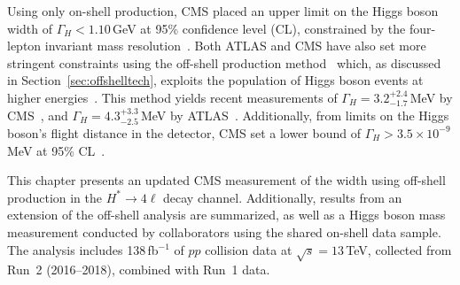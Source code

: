 Using only on-shell production, CMS placed an upper limit on the Higgs boson width of $\Gamma_H < 1.10$\,GeV at 95\% confidence level (CL), constrained by the four-lepton invariant mass resolution~\cite{Khachatryan:2014jba, Sirunyan:2017exp}. Both ATLAS and CMS have also set more stringent constraints using the off-shell production method~\cite{Khachatryan:2014iha, Aad:2015xua, Khachatryan:2015mma, Khachatryan:2016ctc, Aaboud:2018puo, Sirunyan:2019twz, CMS:2022ley} which, as discussed in Section~\ref{sec:offshelltech}, exploits the population of Higgs boson events at higher energies~\cite{Caola:2013yja, Kauer:2012hd, Campbell:2013una}. This method yields recent measurements of $\Gamma_H = 3.2^{+2.4}_{-1.7}$\,MeV by CMS~\cite{CMS:2022ley}, and $\Gamma_H = 4.3^{+3.3}_{-2.5}$\,MeV by ATLAS~\cite{atlascollaboration2023evidence}. Additionally, from limits on the Higgs boson's flight distance in the detector, CMS set a lower bound of $\Gamma_H > 3.5 \times 10^{-9}$\,MeV at 95\% CL~\cite{Khachatryan:2015mma}.

This chapter presents an updated CMS measurement of the \Hboson width using off-shell production in the $H^* \to 4\ell$ decay channel. Additionally, results from an extension of the off-shell analysis are summarized, as well as a Higgs boson mass measurement conducted by collaborators using the shared on-shell data sample. The analysis includes 138\,fb$^{-1}$ of $pp$ collision data at $\sqrt{s} = 13$\,TeV, collected from Run~2 (2016--2018), combined with Run~1 data.



